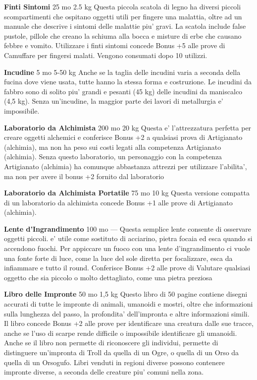 \documentclass[a4paper,11pt,twoside,openany]{book}
\begin{document}
{\textbf{Finti Sintomi} 25 mo 2.5 kg Questa piccola scatola di legno ha diversi piccoli scompartimenti che ospitano oggetti utili per fingere una malattia, oltre ad un manuale che descrive i sintomi delle malattie piu' gravi. La scatola include false pustole, pillole che creano la schiuma alla bocca e misture di erbe che causano febbre e vomito. Utilizzare i finti sintomi concede Bonus +5 alle prove di Camuffare per fingersi malati. Vengono consumati dopo 10 utilizzi.

\textbf{Incudine} 5 mo 5-50 kg Anche se la taglia delle incudini varia a seconda della fucina dove viene usata, tutte hanno la stessa forma e costruzione. Le incudini da fabbro sono di solito piu' grandi e pesanti (45 kg) delle incudini da maniscalco (4,5 kg). Senza un'incudine, la maggior parte dei lavori di metallurgia e' impossibile.

\textbf{Laboratorio da Alchimista} 200 mo 20 kg Questa e' l'attrezzatura perfetta per creare oggetti alchemici e conferisce Bonus +2 a qualsiasi prova di Artigianato (alchimia), ma non ha peso sui costi legati alla competenza Artigianato (alchimia). Senza questo laboratorio, un personaggio con la competenza Artigianato (alchimia) ha comunque abbastanza attrezzi per utilizzare l'abilita', ma non per avere il bonus +2 fornito dal laboratorio

\textbf{Laboratorio da Alchimista Portatile} 75 mo 10 kg Questa versione compatta di un laboratorio da alchimista concede Bonus +1 alle prove di Artigianato (alchimia).

\textbf{Lente d'Ingrandimento} 100 mo --- Questa semplice lente consente di osservare oggetti piccoli. e' utile come sostituto di acciarino, pietra focaia ed esca quando si accendono fuochi. Per appiccare un fuoco con una lente d'ingrandimento ci vuole una fonte forte di luce, come la luce del sole diretta per focalizzare, esca da infiammare e tutto il round. Conferisce Bonus +2 alle prove di Valutare qualsiasi oggetto che sia piccolo o molto dettagliato, come una pietra preziosa 

\textbf{Libro delle Impronte} 50 mo 1,5 kg Questo libro di 50 pagine contiene disegni accurati di tutte le impronte di animali, umanoidi e mostri, oltre che informazioni sulla lunghezza del passo, la profondita' dell'impronta e altre informazioni simili. Il libro concede Bonus +2 alle prove per identificare una creatura dalle sue tracce, anche se l'uso di scarpe rende difficile o impossibile identificare gli umanoidi. Anche se il libro non permette di riconoscere gli individui, permette di distinguere un'impronta di Troll da quella di un Ogre, o quella di un Orso da quella di un Orsogufo. Libri venduti in regioni diverse possono contenere impronte diverse, a seconda delle creature piu' comuni nella zona.

}
\end{document}
